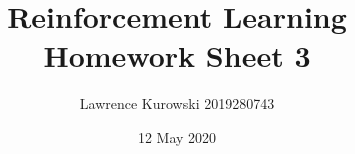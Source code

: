 \documentclass[a4paper,twoside,12pt,fleqn]{scrartcl}
\begin{document}
\title{Reinforcement Learning\\Homework Sheet 3}
\subtitle{Lawrence Kurowski 2019280743}
\date{12 May 2020}
\maketitle



%

%
\end{document}
